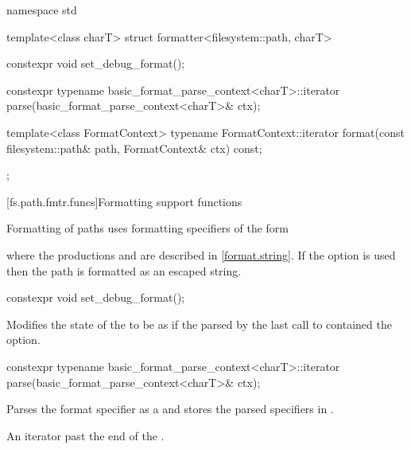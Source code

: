 %
\begin{codeblock}
namespace std {
  template<class charT> struct formatter<filesystem::path, charT> {
    constexpr void set_debug_format();

    constexpr typename basic_format_parse_context<charT>::iterator
      parse(basic_format_parse_context<charT>& ctx);

    template<class FormatContext>
      typename FormatContext::iterator
        format(const filesystem::path& path, FormatContext& ctx) const;
  };
}
\end{codeblock}

[fs.path.fmtr.funcs]{Formatting support functions}

\pnum
Formatting of paths uses formatting specifiers of the form
\begin{ncbnf}
\br
       
\end{ncbnf}
where the productions  and 
are described in \ref{format.string}.
If the  option is used then
the path is formatted as an escaped string.

%
\begin{itemdecl}
constexpr void set_debug_format();
\end{itemdecl}

\begin{itemdescr}
\pnum
\effects
Modifies the state of the  to be as if
the  parsed by the last call to 
contained the  option.
\end{itemdescr}

%
\begin{itemdecl}
constexpr typename basic_format_parse_context<charT>::iterator
  parse(basic_format_parse_context<charT>& ctx);
\end{itemdecl}

\begin{itemdescr}
\pnum
\effects
Parses the format specifier as a  and
stores the parsed specifiers in .

\pnum
\returns
An iterator past the end of the .
\end{itemdescr}

